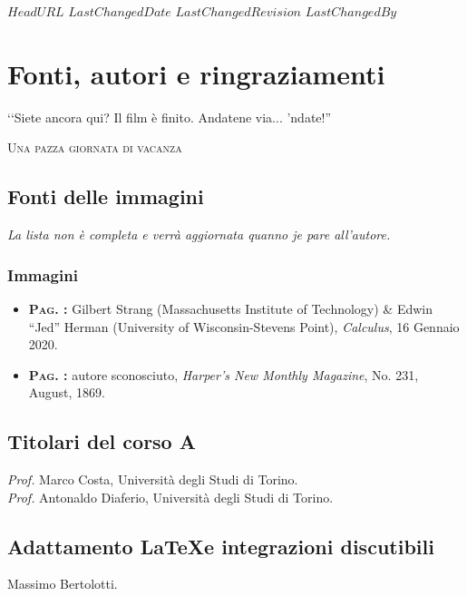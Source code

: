 \svnidlong
{$HeadURL$}
{$LastChangedDate$}
{$LastChangedRevision$}
{$LastChangedBy$}

\chapter{Fonti, autori e ringraziamenti}

\begin{introduction}
  ‘‘Siete ancora qui? Il film è finito. Andatene via... 'ndate!''
	\begin{flushright}
		\textsc{Una pazza giornata di vacanza}
	\end{flushright}
\end{introduction}

\section*{Fonti delle immagini}
\textit{La lista non è completa e verrà aggiornata quanno je pare all'autore.}
\subsection*{Immagini}
\begin{itemize}
\item \textsc{\textbf{Pag. \pageref{vectimmagine}:}} Gilbert Strang (Massachusetts Institute of Technology) \& Edwin “Jed” Herman (University of Wisconsin-Stevens Point), \textit{Calculus}, 16 Gennaio 2020.
\item \textsc{\textbf{Pag. \pageref{jouleimmagine}:}} autore sconosciuto, \textit{Harper's New Monthly Magazine}, No. 231, August, 1869.
\end{itemize}

\section*{Titolari del corso A}

\textit{Prof.} Marco Costa, Università degli Studi di Torino.\\
\textit{Prof.} Antonaldo Diaferio, Università degli Studi di Torino.

\section*{Adattamento \LaTeX e integrazioni discutibili}
Massimo Bertolotti.

